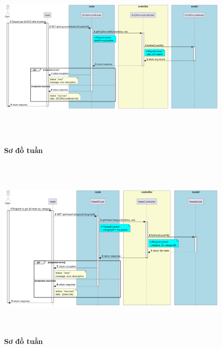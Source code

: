 \documentclass{article}%
\begin{document}
\begin{figure}[H]
  \centering
  \includegraphics[width=16cm,height=9cm]{Images/server/sequence/server/getEcgRecordsByUserId.png}
  \caption[Sơ đồ tuần tự ]{\bfseries \fontsize{12pt}{0pt}
  \selectfont Sơ đồ tuần }
  \label{hinh21} %
\end{figure}


\begin{figure}[H]
  \centering
  \includegraphics[width=16cm,height=9cm]{Images/server/sequence/server/getNewsByCategory.png}
  \caption[Sơ đồ tuần tự ]{\bfseries \fontsize{12pt}{0pt}
  \selectfont Sơ đồ tuần }
  \label{hinh21} %
\end{figure}
\end{document}
